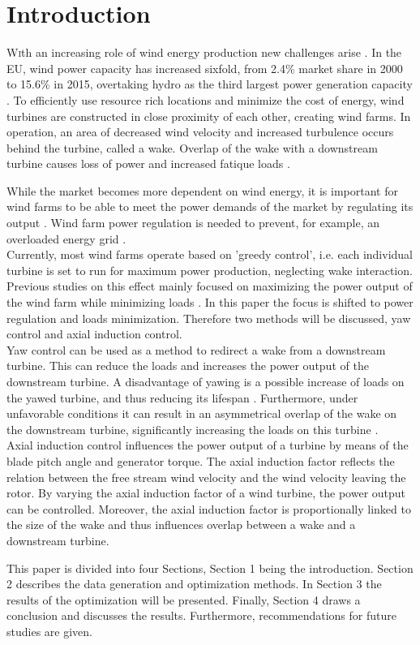 \section{Introduction}
\lettrine[nindent=0em,lines=3]
With an increasing role of wind energy production new challenges arise \cite{Nat2016}. In the EU, wind power capacity has increased sixfold, from 2.4\% market share in 2000 to 15.6\% in 2015, overtaking hydro as the third largest power generation capacity \cite{EWEA2016}. To efficiently use resource rich locations and minimize the cost of energy, wind turbines are constructed in close proximity of each other, creating wind farms. In operation, an area of decreased wind velocity and increased turbulence occurs behind the turbine, called a wake. Overlap of the wake with a downstream turbine causes loss of power and increased fatique loads \cite{Boersma2017, Wilson2017, Dijk2016, Fleming2014, Zalkind2016}. 

While the market becomes more dependent on wind energy, it is important for wind farms to be able to meet the power demands of the market by regulating its output \cite{Tande2003}. Wind farm power regulation is needed to prevent, for example, an overloaded energy grid \cite{Hansen2014}.  \\
\indent Currently, most wind farms operate based on 'greedy control', i.e. each individual turbine is set to run for maximum power production, neglecting wake interaction. Previous studies on this effect mainly focused on maximizing the power output of the wind farm while minimizing loads \cite{Wilson2017, Dijk2016, vanDijk2016}. In this paper the focus is shifted to power regulation and loads minimization. Therefore two methods will be discussed, yaw control and axial induction control. \\
\indent Yaw control can be used as a method to redirect a wake from a downstream turbine. This can reduce the loads and increases the power output of the downstream turbine. A disadvantage of yawing is a possible increase of loads on the yawed turbine, and thus reducing its lifespan \cite{Zalkind2016,Kanev2017}. Furthermore, under unfavorable conditions it can result in an asymmetrical overlap of the wake on the downstream turbine, significantly increasing the loads on this turbine \cite{Wilson2017,Dijk2016}. \\
\indent Axial induction control influences the power output of a turbine by means of the blade pitch angle and generator torque. The axial induction factor reflects the relation between the free stream wind velocity and the wind velocity leaving the rotor. By varying the axial induction factor of a wind turbine, the power output can be controlled. Moreover, the axial induction factor is proportionally linked to the size of the wake and thus influences overlap between a wake and a downstream turbine.  

This paper is divided into four Sections, Section 1 being the introduction. Section 2 describes the data generation and optimization methods. In Section 3 the results of the optimization will be presented. Finally, Section 4 draws a conclusion and discusses the results. Furthermore, recommendations for future studies are given.

